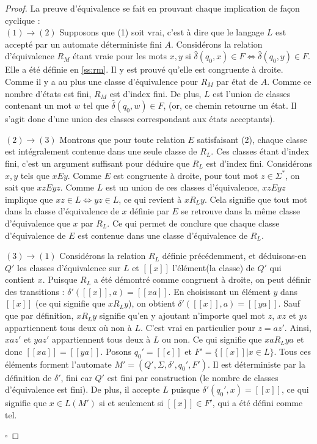 	\begin{proof}La preuve d'équivalence se fait en prouvant chaque implication de façon cyclique :\\
		
		$(1)\rightarrow(2)$ Supposons que (1) soit vrai, c'est à dire que le langage $L$ est accepté par un automate déterministe fini $A$. Considérons la relation d'équivalence $R_M$ étant vraie pour les mots $x,y$ si $\hat{\delta}(q_0,x)\in F \iff \hat{\delta}(q_0,y)\in F$. Elle a été définie en \ref{ss:rm}. Il y est prouvé qu'elle est congruente à droite. Comme il y a au plus une classe d'équivalence pour $R_M$ par état de $A$. Comme ce nombre d'états est fini, $R_M$ est d'index fini. De plus, $L$ est l'union de classes contenant un mot $w$ tel que $\hat{\delta}(q_0,w) \in F$, (or, ce chemin retourne un état. Il s'agit donc d'une union des classes correspondant aux états acceptants).
		
		$(2)\rightarrow(3)$ Montrons que pour toute relation $E$ satisfaisant (2), chaque classe est intégralement contenue dans une seule classe de $R_L$. Ces classes étant d'index fini, c'est un argument suffisant pour déduire que $R_L$ est d'index fini. Considérons $x,y$ tels que $xEy$. Comme $E$ est congruente à droite, pour tout mot $z \in \Sigma^*$, on sait que $xzEyz$. Comme $L$ est un union de ces classes d'équivalence, $xzEyz$ implique que $xz \in L \Leftrightarrow yz \in L$, ce qui revient à $xR_Ly$. Cela signifie que tout mot dans la classe d'équivalence de $x$ définie par $E$ se retrouve dans la même classe d'équivalence que $x$ par $R_L$. Ce qui permet de conclure que chaque classe d'équivalence de $E$ est contenue dans une classe d'équivalence de $R_L$. 
	
		
		$(3)\rightarrow(1)$ Considérons la relation $R_L$ définie précédemment, et déduisons-en $Q'$ les classes d'équivalence sur $L$ et $[[x]]$ l'élément(la classe) de $Q'$ qui contient $x$. Puisque $R_L$ a été démontré comme congruent à droite, on peut définir des transitions : $\delta'([[x]],a) = [[xa]]$. En choisissant un élément $y$ dans $[[x]]$ (ce qui signifie que $xR_Ly$), on obtient $\delta'([[x]],a)=[[ya]]$. Sauf que par définition, $xR_Ly$ signifie qu'en y ajoutant n'importe quel mot $z$, $xz$ et $yz$ appartiennent tous deux où non à $L$. C'est vrai en particulier pour $z=az'$. Ainsi, $xaz'$ et $yaz'$ appartiennent tous deux à $L$ ou non. Ce qui signifie que $xaR_Lya$ et donc $[[xa]]=[[ya]]$. Posons $q_0'=[[\epsilon]]$ et $F' = \{[[x]]|x \in L\}$. Tous ces éléments forment l'automate $M'=(Q', \Sigma, \delta', q_0', F')$. Il est déterministe par la définition de $\delta'$, fini car $Q'$ est fini par construction (le nombre de classes d'équivalence est fini). De plus, il accepte $L$ puisque $\delta'(q_0',x)=[[x]]$, ce qui signifie que $x \in L(M')$ si et seulement si $[[x]] \in F'$, qui a été défini comme tel.
		
		
		\hfill$\square$
	\end{proof}


